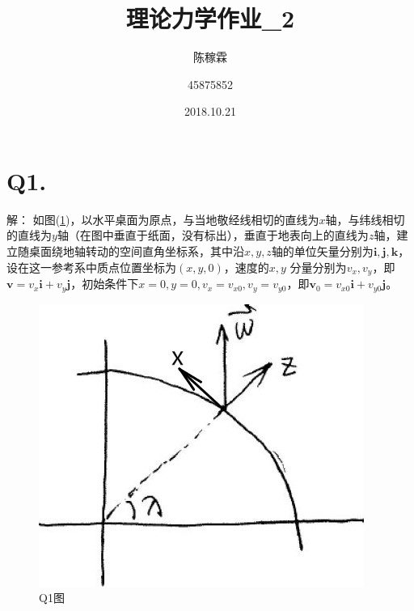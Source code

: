 \documentclass[10pt,a4paper]{article}
\title{理论力学作业\_2}
\author{陈稼霖 \and 45875852}
\date{2018.10.21}
\theoremstyle{remark}
\begin{document}
\maketitle
\section*{Q1.}解：
如图(\ref{FigureofHomework_2Problem_1})，以水平桌面为原点，与当地敬经线相切的直线为$x$轴，与纬线相切的直线为$y$轴（在图中垂直于纸面，没有标出），垂直于地表向上的直线为$z$轴，建立随桌面绕地轴转动的空间直角坐标系，其中沿$x,y,z$轴的单位矢量分别为$\bm{i},\bm{j},\bm{k}$，设在这一参考系中质点位置坐标为$(x,y,0)，$速度的$x,y$ 分量分别为$v_x,v_y$，即$\bm{v} = v_x\bm{i} + v_y\bm{j}$，初始条件下$x = 0, y = 0, v_x = v_{x0}, v_y = v_{y0}$，即$\bm{v}_0 = v_{x0}\bm{i} + v_{y0}\bm{j}$。
\begin{figure}[h]
\centering
\includegraphics[scale=.6]{FigureofHomework_2Problem_1.jpg}
\caption{Q1图}\label{FigureofHomework_2Problem_1}
\end{figure}
\end{document}
